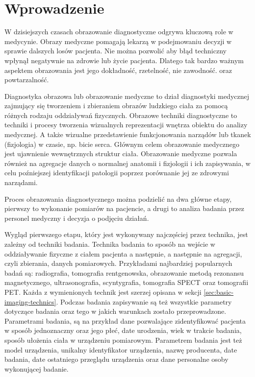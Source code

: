 \section{Wprowadzenie}


W dzisiejszych czasach obrazowanie diagnostyczne odgrywa kluczową role w medycynie.
Obrazy medyczne pomagają lekarzą w podejmowaniu decyzji w sprawie dalszych losów pacjenta.
Nie można pozwolić aby błąd techniczny wpłynął negatywnie na zdrowie lub życie pacjenta.
Dlatego tak bardzo ważnym aspektem obrazowania jest jego dokładność, rzetelność, nie zawodność. oraz powtarzalność.

Diagnostyka obrazowa lub obrazowanie medyczne to dział diagnostyki medycznej zajmujący się tworzeniem i zbieraniem obrazów ludzkiego ciała za pomocą różnych rodzaju oddziaływań fizycznych.
Obrazowe techniki diagnostyczne to techniki i procesy tworzenia wizualnych reprezentacji wnętrza obiektu do analizy medycznej.
A także wizualne przedstawienie funkcjonowania narządów lub tkanek (fizjologia) w czasie, np. bicie serca.
Głównym celem obrazowanie medycznego jest ujawnienie wewnętrznych struktur ciała.
Obrazowanie medyczne pozwala również na agregacje danych o normalnej anatomii i fizjologii i ich zapisywania, w celu poźniejszej identyfikacji patologii poprzez porównanie jej ze zdrowymi narządami.

Proces obrazowania diagnostycznego można podzielić na dwa główne etapy, pierwszy to wykonanie pomiarów na pacjencie, a drugi to analiza badania przez personel medyczny i decyzja o podjęciu działań.

Wygląd pierwszego etapu, który jest wykonywany najczęściej przez technika, jest zależny od techniki badania.
Technika badania to sposób na wejście w oddziaływanie fizyczne z ciałem pacjenta a następnie, a następnie na agregacji, czyli zbierania, danych pomiarowych.
Przykładami najbardziej popularnych badań są: radiografia, tomografia rentgenowska, obrazowanie metodą rezonansu magnetycznego, ultrasonografia, scyntygrafia, tomografia SPECT oraz tomografii PET.
Każda z wymienionych technik jest szerzej opisana w sekcji \ref{sec:basic-imaging-technics}.
Podczas badania zapisywanie są też wszystkie parametry dotyczące badania oraz tego w jakich warunkach zostało przeprowadzone.
Parametrami badania, są na przykład dane pozwalające zidentyfikować pacjenta w sposób jednoznaczny oraz jego płeć, date urodzenia, wiek w trakcie badania, sposób ułożenia ciała w urządzeniu pomiarowym.
Parametrem badania jest też model urządzenia, unikalny identyfikator urządzenia, nazwę producenta, date badania, date ostatniego przeglądu urządzenia oraz dane personalne osoby wykonującej badanie.

